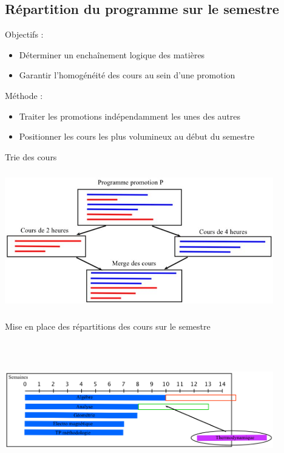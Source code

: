 \documentclass{beamer}
\begin{document}
\subsection{Répartition du programme sur le semestre}
\begin{frame}
Objectifs :
\begin{itemize}
\item Déterminer un enchaînement logique des matières
\item Garantir l'homogénéité des cours au sein d'une promotion
\end{itemize}
\vspace{\baselineskip}
Méthode :
\begin{itemize}
\item Traiter les promotions indépendamment les unes des autres
\item Positionner les cours les plus volumineux au début du semestre
\end{itemize}
\end{frame}

\begin{frame}
Trie des cours
\begin{center}
\includegraphics [width=117mm, height=60mm]{Dessin1.jpg}
\end{center}
\end{frame}

\begin{frame}
Mise en place des répartitions des cours sur le semestre
\begin{center}
\includegraphics [width=117mm, height=60mm]{RepartitionSemestre2.png}
\end{center}
\end{frame}
\end{document}
